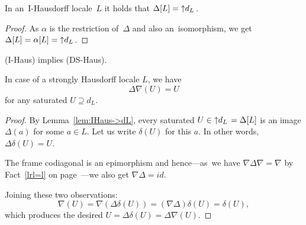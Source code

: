 \begin{lem} \label{lem:IHaus->dL}
  In an~I-Hausdorff locale~$L$ it holds that $\Delta[L] = \left\uparrow d_L \right.$.
\end{lem}
\begin{proof}
  As $\alpha$ is the restriction of~$\Delta$ and also an~isomorphism, we get
  $\Delta[L] = \alpha[L] = \left\uparrow d_L \right.$.
\end{proof}

\begin{thm} \label{IHaus->DSHaus}
  (I-Haus) implies (DS-Haus).
\end{thm}

\begin{lem} \label{lem:delta-nabla=id}
  In case of a strongly Hausdorff locale $L$, we have
  \[
    \Delta\nabla(U) = U
  \]
  for any saturated $U \supseteq d_L$.
\end{lem}
\begin{proof}
  By Lemma~\ref{lem:IHaus->dL}, every saturated $U\in \left\uparrow d_L \right. = \Delta[L]$ is an
  image $\Delta(a)$ for some $a\in L$.
  Let us write $\delta(U)$ for this $a$.
  In other words, $\Delta\delta(U) = U$.

  The frame codiagonal is an epimorphism and hence---as~we have $\nabla \Delta
  \nabla = \nabla$ by Fact~\ref{lrl=l} on page~\pageref{lrl=l}---we also get
  $\nabla \Delta = id$.

  Joining these two observations:
  \[
    \nabla (U) = \nabla (\Delta\delta (U)) = (\nabla \Delta)\delta (U) =
    \delta(U),
  \]
  which produces the desired $U = \Delta \delta (U) = \Delta \nabla (U)$.
\end{proof}

